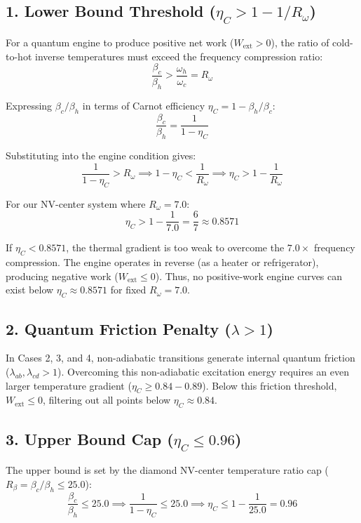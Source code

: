 \documentclass[11pt,a4paper]{article}
\begin{document}
\subsection{1. Lower Bound Threshold ($\eta_C > 1 - 1/R_\omega$)}
For a quantum engine to produce positive net work ($W_{\mathrm{ext}} > 0$), the ratio of cold-to-hot inverse temperatures must exceed the frequency compression ratio:
\begin{equation}
\frac{\beta_c}{\beta_h} > \frac{\omega_h}{\omega_c} = R_\omega
\end{equation}

Expressing $\beta_c / \beta_h$ in terms of Carnot efficiency $\eta_C = 1 - \beta_h/\beta_c$:
\begin{equation}
\frac{\beta_c}{\beta_h} = \frac{1}{1 - \eta_C}
\end{equation}

Substituting into the engine condition gives:
\begin{equation}
\frac{1}{1 - \eta_C} > R_\omega \implies 1 - \eta_C < \frac{1}{R_\omega} \implies \eta_C > 1 - \frac{1}{R_\omega}
\end{equation}

For our NV-center system where $R_\omega = 7.0$:
\begin{equation}
\eta_C > 1 - \frac{1}{7.0} = \frac{6}{7} \approx 0.8571
\end{equation}

If $\eta_C < 0.8571$, the thermal gradient is too weak to overcome the $7.0\times$ frequency compression. The engine operates in reverse (as a heater or refrigerator), producing negative work ($W_{\mathrm{ext}} \le 0$). Thus, no positive-work engine curves can exist below $\eta_C \approx 0.8571$ for fixed $R_\omega = 7.0$.

\subsection{2. Quantum Friction Penalty ($\lambda > 1$)}
In Cases 2, 3, and 4, non-adiabatic transitions generate internal quantum friction ($\lambda_{ab}, \lambda_{cd} > 1$). Overcoming this non-adiabatic excitation energy requires an even larger temperature gradient ($\eta_C \ge 0.84 - 0.89$). Below this friction threshold, $W_{\mathrm{ext}} \le 0$, filtering out all points below $\eta_C \approx 0.84$.

\subsection{3. Upper Bound Cap ($\eta_C \le 0.96$)}
The upper bound is set by the diamond NV-center temperature ratio cap ($R_\beta = \beta_c / \beta_h \le 25.0$):
\begin{equation}
\frac{\beta_c}{\beta_h} \le 25.0 \implies \frac{1}{1 - \eta_C} \le 25.0 \implies \eta_C \le 1 - \frac{1}{25.0} = 0.96
\end{equation}
\end{document}
